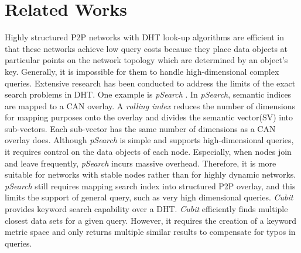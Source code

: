 \documentclass[conference]{IEEEtran}
\begin{document}
\section{Related Works}
\label{sec:related_works}
Highly structured P2P networks with DHT look-up algorithms 
\cite{is:Chord, sr:CAN, bz:Tapestry, pr:Symphony} 
are efficient in that these networks achieve low query costs  
because they place data objects at particular points on the network topology
which are determined by an object's key. 
Generally, it is impossible for them to handle
high-dimensional complex queries.  Extensive research has been conducted 
to address the limits of the exact search problems in DHT.
One example is \emph{pSearch} \cite{psearch}.
In \emph{pSearch}, semantic indices are mapped to a CAN overlay. 
A \emph{rolling index} reduces the number of dimensions for mapping purposes 
onto the overlay and divides the semantic vector(SV) into sub-vectors. 
Each sub-vector has the same number of dimensions as a CAN overlay does.
Although \emph{pSearch} is simple and supports high-dimensional queries, 
it requires control on the data objects of each node. Especially, when 
nodes join and leave frequently, \emph{pSearch} incurs massive overhead.
Therefore, it is more suitable for networks with stable nodes rather than
for highly dynamic networks.
\emph{pSearch} still requires mapping search index into structured P2P overlay, and
this limits the support of general query, such as very high dimensional queries.
\emph{Cubit}\cite{cubit} provides keyword search capability over a DHT. \emph{Cubit} 
efficiently finds multiple closest data sets for a given query. However, 
it requires the creation of a keyword metric space and only returns multiple 
similar results to compensate for typos in queries. 

\end{document}
